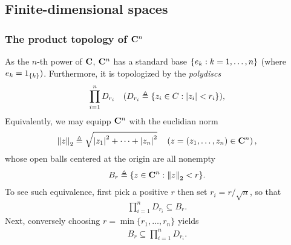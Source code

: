 \subsection{Finite-dimensional spaces}\label{notations: vector spaces: finite-dimensional vector spaces}%
%
%
\subsubsection{The product topology of $\C^n$}\label{notations: vector spaces: finite-dimensional vector spaces: the product topology of Cn}
%
As the $n$-th power of $\C$, $\C^n$ has a standard base $\set{e_k}{k = 1, \dots, n}$ %
(where $e_k = 1_{\singleton{k}})$. %
Furthermore, it is topologized by the {\it polydiscs} %
\begin{align}
  \prod_{i=1}^{n} D_{r_i} \quad (D_{r_i} \Def \set{z_i \in C}{\magnitude{z_i} < r_i}), %
\end{align}
Equivalently, we may equipp $\C^n$ with the euclidian norm %
\begin{align}
  \norma{2}{z} \Def \sqrt{\magnitude{z_1}^2 + \cdots + \magnitude{z_n}^2} \quad \left(z = (z_1, \dots, z_n) \in \C^n\right), 
\end{align}
%
whose open balls centered at the origin are all nonempty%
\begin{align}
  B_r \Def \set{z\in \C^n}{\norma{2}{z} < r}.
\end{align}
To see such equivalence, first pick a positive $r$ then set $r_i = r/\sqrt{n}$, so that %
\begin{align}
\prod_{i=1}^{n} D_{r_i} \subseteq B_r. 
\end{align}
%
Next, conversely choosing $r = \min\{r_1, \dots, r_n\}$ yields %
\begin{align}
   B_r \subseteq \prod_{i=1}^{n} D_{r_i} .
\end{align}
%
